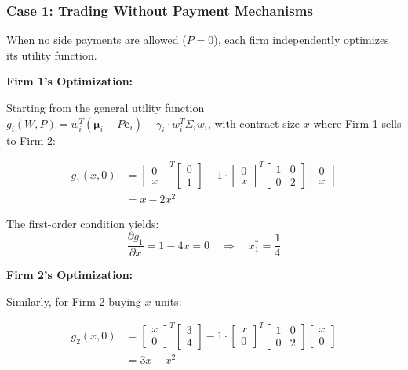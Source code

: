 \subsubsection{Case 1: Trading Without Payment Mechanisms}

When no side payments are allowed ($P = 0$), each firm independently optimizes its utility function.

\textbf{Firm 1's Optimization:}

Starting from the general utility function $g_i(W, P) = w_i^T(\boldsymbol{\mu}_i - P\boldsymbol{e}_i) - \gamma_i \cdot w_i^T\Sigma_i w_i$, with contract size $x$ where Firm 1 sells to Firm 2:

\begin{align}
    g_1(x, 0) &= \begin{bmatrix} 0 \\ x \end{bmatrix}^T \begin{bmatrix} 0 \\ 1 \end{bmatrix} - 1 \cdot \begin{bmatrix} 0 \\ x \end{bmatrix}^T \begin{bmatrix} 1 & 0 \\ 0 & 2 \end{bmatrix} \begin{bmatrix} 0 \\ x \end{bmatrix} \\
    &= x - 2x^2
\end{align}

The first-order condition yields:
\begin{equation}
    \frac{\partial g_1}{\partial x} = 1 - 4x = 0 \quad \Rightarrow \quad x_1^* = \frac{1}{4}
\end{equation}

\textbf{Firm 2's Optimization:}

Similarly, for Firm 2 buying $x$ units:

\begin{align}
    g_2(x, 0) &= \begin{bmatrix} x \\ 0 \end{bmatrix}^T \begin{bmatrix} 3 \\ 4 \end{bmatrix} - 1 \cdot \begin{bmatrix} x \\ 0 \end{bmatrix}^T \begin{bmatrix} 1 & 0 \\ 0 & 2 \end{bmatrix} \begin{bmatrix} x \\ 0 \end{bmatrix} \\
    &= 3x - x^2
\end{align}

